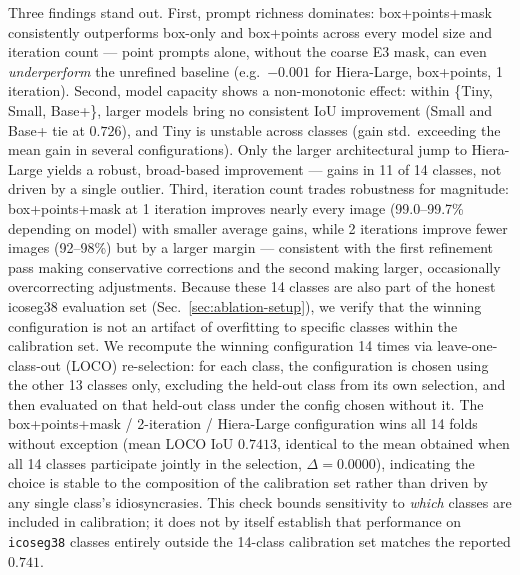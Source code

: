 Three findings stand out. First, prompt richness dominates:
box+points+mask consistently outperforms box-only and box+points
across every model size and iteration count — point prompts alone,
without the coarse E3 mask, can even \emph{underperform} the
unrefined baseline (e.g.\ $-0.001$ for Hiera-Large, box+points,
1 iteration). Second, model capacity shows a non-monotonic effect:
within \{Tiny, Small, Base+\}, larger models bring no consistent
IoU improvement (Small and Base+ tie at $0.726$), and Tiny is
unstable across classes (gain std.\ exceeding the mean gain in
several configurations). Only the larger architectural jump to
Hiera-Large yields a robust, broad-based improvement — gains in 11
of 14 classes, not driven by a single outlier. Third, iteration
count trades robustness for magnitude: box+points+mask at
1 iteration improves nearly every image (99.0--99.7\% depending on
model) with smaller average gains, while 2 iterations improve fewer
images (92--98\%) but by a larger margin — consistent with the
first refinement pass making conservative corrections and the
second making larger, occasionally overcorrecting adjustments. Because these 14 classes are also part of the honest icoseg38
evaluation set (Sec.~\ref{sec:ablation-setup}), we verify that the
winning configuration is not an artifact of overfitting to specific
classes within the calibration set. We recompute the winning
configuration 14 times via leave-one-class-out (LOCO) re-selection:
for each class, the configuration is chosen using the other 13
classes only, excluding the held-out class from its own selection,
and then evaluated on that held-out class under the config chosen
without it. The box+points+mask / 2-iteration / Hiera-Large
configuration wins all 14 folds without exception (mean LOCO IoU
$0.7413$, identical to the mean obtained when all 14 classes
participate jointly in the selection, $\Delta = 0.0000$), indicating
the choice is stable to the composition of the calibration set rather
than driven by any single class's idiosyncrasies. This check bounds
sensitivity to \emph{which} classes are included in calibration; it
does not by itself establish that performance on \texttt{icoseg38}
classes entirely outside the 14-class calibration set matches the
reported $0.741$.

